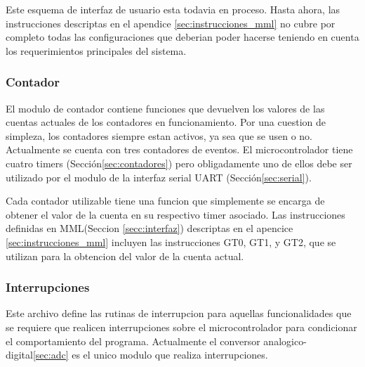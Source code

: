 Este esquema de interfaz de usuario esta todavia en proceso. Hasta ahora, las instrucciones descriptas en el apendice \ref{sec:instrucciones_mml} no cubre por completo todas las configuraciones que deberian poder hacerse teniendo en cuenta los requerimientos principales del sistema.


\subsubsection{Contador}
El modulo de contador contiene funciones que devuelven los valores de las cuentas actuales de los contadores en funcionamiento. Por una cuestion de simpleza, los contadores siempre estan activos, ya sea que se usen o no. Actualmente se cuenta con tres contadores de eventos. El microcontrolador tiene cuatro timers (Secci\'on\ref{sec:contadores}) pero obligadamente uno de ellos debe ser utilizado por el modulo de la interfaz serial UART (Secci\'on\ref{sec:serial}).

Cada contador utilizable tiene una funcion que simplemente se encarga de obtener el valor de la cuenta en su respectivo timer asociado. Las instrucciones definidas en MML(Seccion \ref{secc:interfaz}) descriptas en el apencice \ref{sec:instrucciones_mml} incluyen las instrucciones GT0, GT1, y GT2, que se utilizan para la obtencion del valor de la cuenta actual.
\subsubsection{Interrupciones}
Este archivo define las rutinas de interrupcion para aquellas funcionalidades que se requiere que realicen interrupciones sobre el microcontrolador para condicionar el comportamiento del programa. Actualmente el conversor analogico-digital\ref{sec:adc} es el unico modulo que realiza interrupciones.


\clearpage